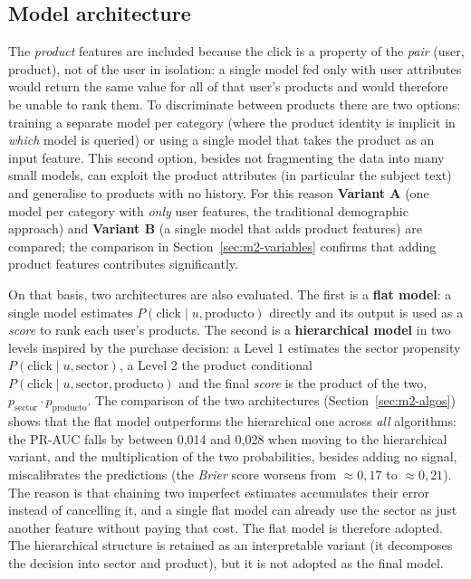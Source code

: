 \subsection{Model architecture}

The \emph{product} features are included because the click is a property of the \emph{pair} (user, product), not of the user in isolation: a single model fed only with user attributes would return the same value for all of that user's products and would therefore be unable to rank them. To discriminate between products there are two options: training a separate model per category (where the product identity is implicit in \emph{which} model is queried) or using a single model that takes the product as an input feature. This second option, besides not fragmenting the data into many small models, can exploit the product attributes (in particular the subject text) and generalise to products with no history. For this reason \textbf{Variant A} (one model per category with \emph{only} user features, the traditional demographic approach) and \textbf{Variant B} (a single model that adds product features) are compared; the comparison in Section~\ref{sec:m2-variables} confirms that adding product features contributes significantly.

On that basis, two architectures are also evaluated. The first is a \textbf{flat model}: a single model estimates $P(\text{click}\mid u,\text{producto})$ directly and its output is used as a \textit{score} to rank each user's products. The second is a \textbf{hierarchical model} in two levels inspired by the purchase decision: a Level 1 estimates the sector propensity $P(\text{click}\mid u,\text{sector})$, a Level 2 the product conditional $P(\text{click}\mid u,\text{sector},\text{producto})$ and the final \textit{score} is the product of the two, $p_\text{sector}\cdot p_\text{producto}$. The comparison of the two architectures (Section~\ref{sec:m2-algos}) shows that the flat model outperforms the hierarchical one across \emph{all} algorithms: the PR-AUC falls by between 0,014 and 0,028 when moving to the hierarchical variant, and the multiplication of the two probabilities, besides adding no signal, miscalibrates the predictions (the \textit{Brier} score worsens from $\approx0{,}17$ to $\approx0{,}21$). The reason is that chaining two imperfect estimates accumulates their error instead of cancelling it, and a single flat model can already use the sector as just another feature without paying that cost. The flat model is therefore adopted. The hierarchical structure is retained as an interpretable variant (it decomposes the decision into sector and product), but it is not adopted as the final model.

